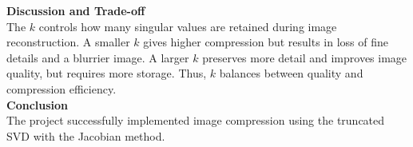 \documentclass[journal]{IEEEtran}
\begin{document}
\textbf{Discussion and Trade-off}\\
The $k$ controls how many singular values are retained during image reconstruction.  
A smaller \(k\) gives higher compression but results in loss of fine details and a blurrier image.  
A larger \(k\) preserves more detail and improves image quality, but requires more storage.  
Thus, \(k\) balances between quality and compression efficiency.\\

\textbf{Conclusion}\\
The project successfully implemented image compression using the truncated SVD with the Jacobian method.  
\end{document}
